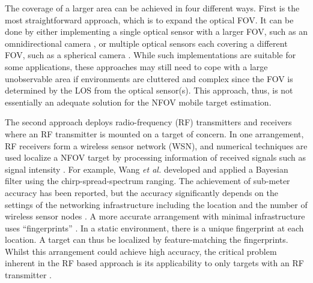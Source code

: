 The coverage of a larger area can be achieved in four different ways.  First is the most straightforward approach, which is to expand the optical FOV.  It can be done by either implementing a single optical sensor with a larger FOV, such as an omnidirectional camera \cite{kobilarov2006,nayar1997}, or multiple optical sensors each covering a different FOV, such as a spherical camera \cite{Jankovic2005}.  While such implementations are suitable for some applications, these approaches may still need to cope with  a large unobservable area if environments are cluttered and complex since the FOV is determined by the LOS from the optical sensor(s).  This approach, thus, is not essentially an adequate solution for the NFOV mobile target estimation.  

The second approach deploys radio-frequency (RF) transmitters and receivers where an RF transmitter is mounted on a target of concern.  In one arrangement, RF receivers form a wireless sensor network (WSN), and numerical techniques are used localize a NFOV target by processing information of received signals such as signal intensity \cite{Bertinato2008,Dai2012,Ni2004,Zhang2010,Liu2007,Gezici2008,Guvenc2009}.  For example, Wang \textit{et al.} \cite{Wang2012} developed and applied a Bayesian filter using the chirp-spread-spectrum ranging.  The achievement of sub-meter accuracy has been reported, but the accuracy significantly depends on the settings of the networking infrastructure including the location and the number of wireless sensor nodes \cite{Jung2011,Gao2013}.  A more accurate arrangement with minimal infrastructure uses ``fingerprints'' \cite{Bahl2000,lad04}.  In a static environment, there is a unique fingerprint at each location.  A target can thus be localized by feature-matching the fingerprints.  Whilst this arrangement could achieve high accuracy, the critical problem inherent in the RF based approach is its applicability to only targets with an RF transmitter \cite{Chen1999,Prigge2004,Seow2008,Khoury2009}. 

